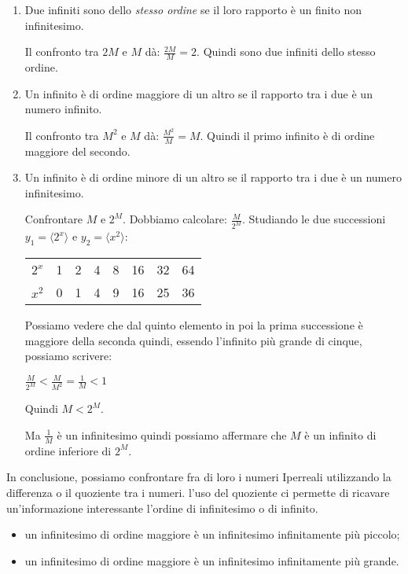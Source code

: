 \begin{enumerate}
 \item Due infiniti sono dello \emph{stesso ordine} se il loro rapporto è un 
finito non infinitesimo.
\begin{esempio}
 Il confronto tra $2M$ e $M$ dà: $\frac{2M}{M} = 2$. Quindi sono due infiniti 
dello stesso ordine.
\end{esempio}
 \item Un infinito è di ordine maggiore di un altro se il rapporto tra i due è 
un numero infinito.
\begin{esempio}
 Il confronto tra $M^2$ e $M$ dà: $\frac{M^2}{M} = M$. Quindi il primo infinito 
è di ordine maggiore del secondo.
\end{esempio}
 \item Un infinito è di ordine minore di un altro se il rapporto tra i due è 
un numero infinitesimo.
\begin{esempio}
 Confrontare $M$ e $2^M$. Dobbiamo calcolare: $\frac{M}{2^M}$. 
Studiando le due successioni 
$y_1=\langle 2^x \rangle$ e $y_2=\langle x^2 \rangle$:
\begin{center}
\begin{tabular}{cccccccc}
$2^x$ & 1 & 2 & 4 & 8 & 16 & 32 & 64\\
$x^2$ & 0 & 1 & 4 & 9 & 16 & 25 & 36
\end{tabular}
\end{center}
Possiamo vedere che dal quinto elemento in poi la prima successione è maggiore 
della seconda quindi, essendo l'infinito più grande di cinque, possiamo 
scrivere:

$\frac{M}{2^M} < \frac{M}{M^2} = \frac{1}{M} < 1$

Quindi $M < 2^M$.

Ma $\frac{1}{M}$ è un infinitesimo quindi possiamo affermare che $M$ è un 
infinito di ordine inferiore di $2^M$.
\end{esempio}
\end{enumerate}

In conclusione, possiamo confrontare fra di loro i numeri Iperreali utilizzando 
la differenza o il quoziente tra i numeri. l'uso del quoziente ci permette di 
ricavare un'informazione interessante l'ordine di infinitesimo o di infinito.
\begin{itemize} [noitemsep]
 \item un infinitesimo di ordine maggiore è un infinitesimo infinitamente più 
piccolo;
 \item un infinitesimo di ordine maggiore è un infinitesimo infinitamente più 
grande.
\end{itemize}

